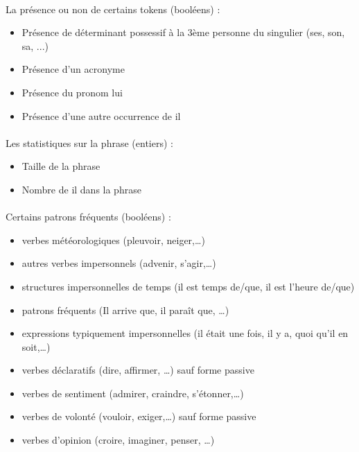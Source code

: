 \documentclass[a4paper,12pt]{article}
\begin{document}
\paragraph{}
\textbullet{} La présence ou non de certains tokens (booléens) :
 \begin{itemize}
  \item Présence de déterminant possessif à la 3ème personne du singulier (ses, son, sa, ...)
  \item Présence d'un acronyme
  \item Présence du pronom \og{}lui\fg{}
  \item Présence d'une autre occurrence de \og{}il\fg{}
 \end{itemize}
 
\paragraph{}
\textbullet{} Les statistiques sur la phrase (entiers) :
 \begin{itemize}
  \item Taille de la phrase
  \item Nombre de \og{}il\fg{} dans la phrase
 \end{itemize}

\paragraph{}
\textbullet{} Certains patrons fréquents (booléens) :
 \begin{itemize}
  \item verbes météorologiques (pleuvoir, neiger,\ldots)
  \item autres verbes impersonnels (advenir, s'agir,\ldots) 
  \item structures impersonnelles de temps (il est temps de/que, il est l'heure de/que)
  \item patrons fréquents (Il arrive que, il paraît que, \ldots)
  \item expressions typiquement impersonnelles (il était une fois, il y a, quoi qu'il en soit,\ldots)
  \item verbes déclaratifs (dire, affirmer, \ldots) sauf forme passive
  \item verbes de sentiment (admirer, craindre, s'étonner,\ldots)
  \item verbes de volonté (vouloir, exiger,\ldots) sauf forme passive
  \item verbes d'opinion (croire, imaginer, penser, \ldots)
 \end{itemize}
\end{document}
